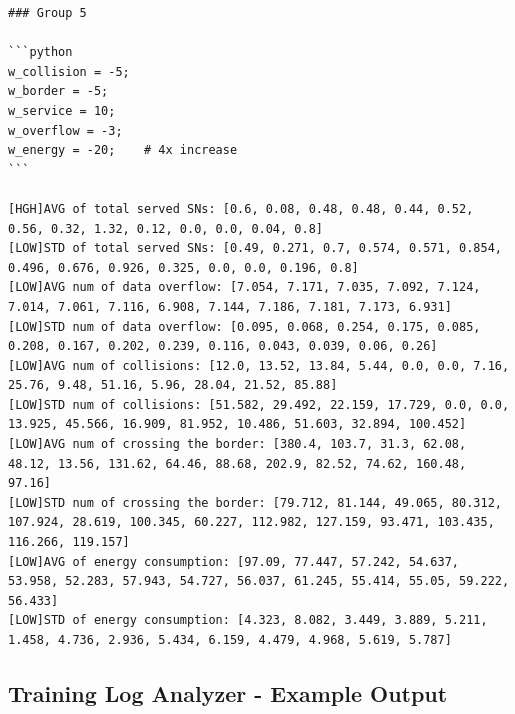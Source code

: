 \documentclass{article}
\begin{document}
\begin{verbatim}
### Group 5

```python
w_collision = -5;
w_border = -5;
w_service = 10;
w_overflow = -3;
w_energy = -20;    # 4x increase
```

[HGH]AVG of total served SNs: [0.6, 0.08, 0.48, 0.48, 0.44, 0.52, 0.56, 0.32, 1.32, 0.12, 0.0, 0.0, 0.04, 0.8]
[LOW]STD of total served SNs: [0.49, 0.271, 0.7, 0.574, 0.571, 0.854, 0.496, 0.676, 0.926, 0.325, 0.0, 0.0, 0.196, 0.8]
[LOW]AVG num of data overflow: [7.054, 7.171, 7.035, 7.092, 7.124, 7.014, 7.061, 7.116, 6.908, 7.144, 7.186, 7.181, 7.173, 6.931]
[LOW]STD num of data overflow: [0.095, 0.068, 0.254, 0.175, 0.085, 0.208, 0.167, 0.202, 0.239, 0.116, 0.043, 0.039, 0.06, 0.26]
[LOW]AVG num of collisions: [12.0, 13.52, 13.84, 5.44, 0.0, 0.0, 7.16, 25.76, 9.48, 51.16, 5.96, 28.04, 21.52, 85.88]
[LOW]STD num of collisions: [51.582, 29.492, 22.159, 17.729, 0.0, 0.0, 13.925, 45.566, 16.909, 81.952, 10.486, 51.603, 32.894, 100.452]
[LOW]AVG num of crossing the border: [380.4, 103.7, 31.3, 62.08, 48.12, 13.56, 131.62, 64.46, 88.68, 202.9, 82.52, 74.62, 160.48, 97.16]
[LOW]STD num of crossing the border: [79.712, 81.144, 49.065, 80.312, 107.924, 28.619, 100.345, 60.227, 112.982, 127.159, 93.471, 103.435, 116.266, 119.157]
[LOW]AVG of energy consumption: [97.09, 77.447, 57.242, 54.637, 53.958, 52.283, 57.943, 54.727, 56.037, 61.245, 55.414, 55.05, 59.222, 56.433]
[LOW]STD of energy consumption: [4.323, 8.082, 3.449, 3.889, 5.211, 1.458, 4.736, 2.936, 5.434, 6.159, 4.479, 4.968, 5.619, 5.787]
\end{verbatim}


\subsection{Training Log Analyzer - Example Output}
\end{document}
